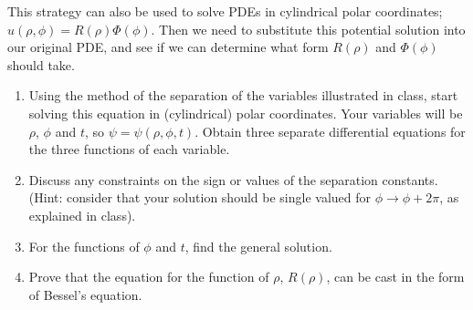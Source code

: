 \documentclass[fleqn]{article}
\begin{document}
  \textcolor{hwColor}{
    This strategy can also be used to solve PDEs in cylindrical polar
    coordinates; $u(\rho, \phi)=R(\rho) \Phi(\phi)$. Then we need to substitute this potential solution into our original PDE, and see
    if we can determine what form $R(\rho)$ and $\Phi(\phi)$ should take.
  }

  \begin{enumerate}
    \item Using the method of the separation of the variables illustrated in class, start solving this equation in (cylindrical) polar coordinates. Your variables will be $\rho$, $\phi$ and $t$, so $\psi=\psi(\rho, 
    \phi, t)$. Obtain  three separate differential equations for the three functions of each variable. 

    \item Discuss any constraints on the sign or values of the separation constants. (Hint: consider that your solution should be single valued for $\phi \rightarrow \phi+ 2\pi$, as explained in class). 

    \item For the functions of $\phi$ and $t$, find the general solution. 

    \item Prove that the equation for the function of $\rho$, $R(\rho)$, can be cast in the form of Bessel's equation.  
  \end{enumerate}
\end{document}
